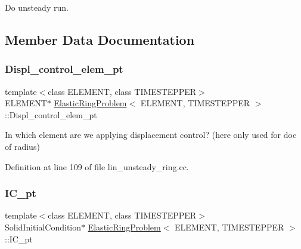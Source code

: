 Do unsteady run. 



\subsection{Member Data Documentation}
\mbox{\label{classElasticRingProblem_aba78b855677ef08ea3d9678dcde8a71b}} 
\subsubsection{\texorpdfstring{Displ\+\_\+control\+\_\+elem\+\_\+pt}{Displ\_control\_elem\_pt}}
{\footnotesize\ttfamily template$<$class E\+L\+E\+M\+E\+NT, class T\+I\+M\+E\+S\+T\+E\+P\+P\+ER$>$ \\
E\+L\+E\+M\+E\+NT$\ast$ \hyperlink{classElasticRingProblem}{Elastic\+Ring\+Problem}$<$ E\+L\+E\+M\+E\+NT, T\+I\+M\+E\+S\+T\+E\+P\+P\+ER $>$\+::Displ\+\_\+control\+\_\+elem\+\_\+pt\hspace{0.3cm}{\ttfamily [private]}}



In which element are we applying displacement control? (here only used for doc of radius) 



Definition at line 109 of file lin\+\_\+unsteady\+\_\+ring.\+cc.

\mbox{\label{classElasticRingProblem_a0d314051b66afb53fa7f28c298f38206}} 
\subsubsection{\texorpdfstring{I\+C\+\_\+pt}{IC\_pt}}
{\footnotesize\ttfamily template$<$class E\+L\+E\+M\+E\+NT, class T\+I\+M\+E\+S\+T\+E\+P\+P\+ER$>$ \\
Solid\+Initial\+Condition$\ast$ \hyperlink{classElasticRingProblem}{Elastic\+Ring\+Problem}$<$ E\+L\+E\+M\+E\+NT, T\+I\+M\+E\+S\+T\+E\+P\+P\+ER $>$\+::I\+C\+\_\+pt\hspace{0.3cm}{\ttfamily [private]}}



